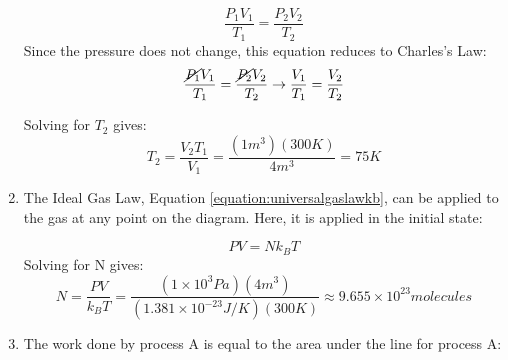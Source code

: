 \begin{mdframed}[backgroundcolor=blue!10!white]
\begin{enumerate}[label=(\alph*)]
		\begin{equation*}
			\frac{P_1V_1}{T_1}=\frac{P_2V_2}{T_2}
		\end{equation*}
	Since the pressure does not change, this equation reduces to Charles's Law:
		\begin{equation*}
		\frac{\cancel{P_1}V_1}{T_1}=\frac{\cancel{P_2}V_2}{T_2} \rightarrow \frac{V_1}{T_1}=\frac{V_2}{T_2}
	\end{equation*}

	Solving for $T_2$ gives:
	\begin{equation*}
		T_2 = \frac{V_2T_1}{V_1} =\frac{(1 \si{m^3}) (300 \si{K})}{4 \si{m^3}} = \boxed{75 \si{K}}
	\end{equation*}

	\item The Ideal Gas Law, Equation \ref{equation:universalgaslawkb}, can be applied to the gas at any point on the diagram.  Here, it is applied in the initial state:
	
	\begin{equation*}
		PV=Nk_BT
	\end{equation*}
	Solving for N gives:
		\begin{equation*}
		N=\frac{PV}{k_BT} = \frac{(1 \times 10^3 \si{Pa})(4 \si{m^3})}{(1.381 \times 10^{-23} \si{J/K})(300 \si{K})} \approx \boxed{9.655 \times 10^{23} \si{molecules}}
	\end{equation*}
		
		\item The work done by process A is equal to the area under the line for process A: 
		
		\begin{center}
\end{center}
\end{enumerate}
\end{mdframed}

